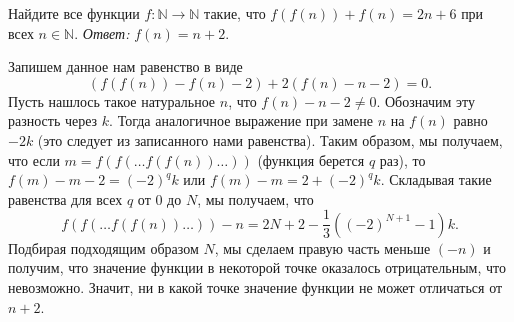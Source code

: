 \problem
Найдите все функции $f \colon \mathbb{N} \to \mathbb{N}$ такие, что
$f(f(n)) + f(n) = 2 n + 6$ при всех $n \in \mathbb{N}$.
\solution
\emph{Ответ:} $f(n) = n + 2$.
\par
Запишем данное нам равенство в виде
\[
    (f(f(n)) - f(n) - 2) + 2 (f(n) - n - 2) = 0
.\]
Пусть нашлось такое натуральное $n$, что $f(n) - n - 2 \neq 0$.
Обозначим эту разность через $k$.
Тогда аналогичное выражение при замене $n$ на $f(n)$ равно $- 2 k$
(это следует из записанного нами равенства).
Таким образом, мы получаем, что если $m = f(f(\ldots f(f(n)) \ldots))$
(функция берется $q$ раз), то $f(m) - m - 2 = (-2)^q k$ или
$f(m) - m = 2 + (-2)^q k$.
Складывая такие равенства для всех $q$ от $0$ до $N$, мы получаем, что
\[
    f(f(\ldots f(f(n)) \ldots)) - n
=
    2 N + 2 - \frac{1}{3} ((-2)^{N+1} - 1) k
.\]
Подбирая подходящим образом $N$, мы сделаем правую часть меньше $(-n)$ и
получим, что значение функции в некоторой точке оказалось отрицательным, что
невозможно.
Значит, ни в какой точке значение функции не может отличаться от $n + 2$.
\endproblem
